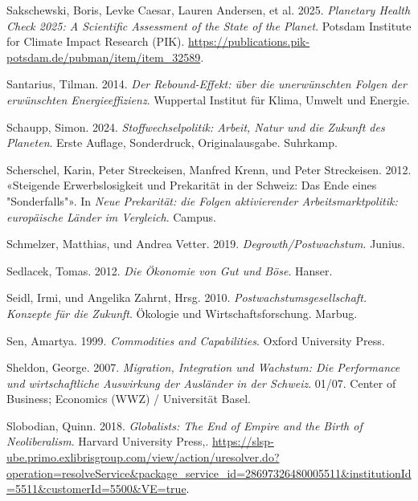\documentclass[
  nswissgerman,
  a4paper,
  DIV=11,
  numbers=noendperiod,
  oneside,
  openany]{scrreprt}
\newlength{\cslhangindent}
\newenvironment{CSLReferences}[2] %
 {\begin{list}{}{%
  \setlength{\itemindent}{0pt}
  \setlength{\leftmargin}{0pt}
  \setlength{\parsep}{0pt}
  \ifodd #1
   \setlength{\leftmargin}{\cslhangindent}
   \setlength{\itemindent}{-1\cslhangindent}
  \fi
  \setlength{\itemsep}{#2\baselineskip}}}
 {\end{list}}
\begin{document}
\begin{CSLReferences}{1}{1}
Sakschewski, Boris, Levke Caesar, Lauren Andersen, et al. 2025.
\emph{Planetary Health Check 2025: A Scientific Assessment of the State
of the Planet}. Potsdam Institute for Climate Impact Research (PIK).
\url{https://publications.pik-potsdam.de/pubman/item/item_32589}.

Santarius, Tilman. 2014. \emph{Der Rebound-Effekt: über die
unerwünschten Folgen der erwünschten Energieeffizienz}. Wuppertal
Institut für Klima, Umwelt und Energie.

Schaupp, Simon. 2024. \emph{Stoffwechselpolitik: Arbeit, Natur und die
Zukunft des Planeten}. Erste Auflage, Sonderdruck, Originalausgabe.
Suhrkamp.

Scherschel, Karin, Peter Streckeisen, Manfred Krenn, und Peter
Streckeisen. 2012. {«Steigende Erwerbslosigkeit und Prekarität in der
Schweiz: Das Ende eines "Sonderfalls"»}. In \emph{Neue Prekarität: die
Folgen aktivierender Arbeitsmarktpolitik: europäische Länder im
Vergleich}. Campus.

Schmelzer, Matthias, und Andrea Vetter. 2019.
\emph{Degrowth/Postwachstum}. Junius.

Sedlacek, Tomas. 2012. \emph{Die Ökonomie von Gut und Böse}. Hanser.

Seidl, Irmi, und Angelika Zahrnt, Hrsg. 2010.
\emph{Postwachstumsgesellschaft. {Konzepte} für die {Zukunft}}. Ökologie
und {Wirtschaftsforschung}. Marbug.

Sen, Amartya. 1999. \emph{Commodities and {Capabilities}}. Oxford
University Press.

Sheldon, George. 2007. \emph{Migration, Integration und Wachstum: Die
Performance und wirtschaftliche Auswirkung der Ausländer in der
Schweiz}. 01/07. Center of Business; Economics (WWZ) / Universität
Basel.

Slobodian, Quinn. 2018. \emph{Globalists: The End of Empire and the
Birth of Neoliberalism}. Harvard University Press,.
\url{https://slsp-ube.primo.exlibrisgroup.com/view/action/uresolver.do?operation=resolveService&package_service_id=28697326480005511&institutionId=5511&customerId=5500&VE=true}.


\end{CSLReferences}
\end{document}
